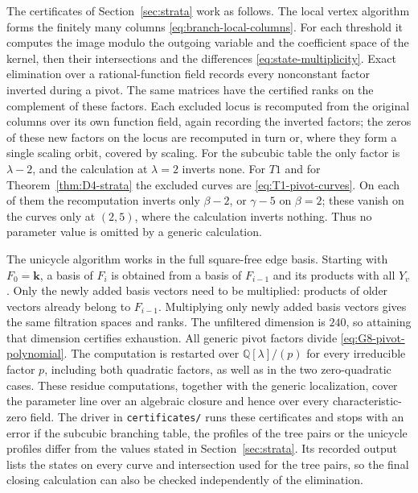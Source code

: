 \documentclass[reqno]{article}
\theoremstyle{plain} %
\theoremstyle{definition}
\theoremstyle{remark}
\newcommand{\K} {\mathbf{k}}
\numberwithin{equation}{section}
\begin{document}
The certificates of Section~\ref{sec:strata} work as follows. The local vertex algorithm forms the finitely many columns
\eqref{eq:branch-local-columns}. For each threshold it computes the image
modulo the outgoing variable and the coefficient space of the kernel,
then their intersections and the differences
\eqref{eq:state-multiplicity}. Exact elimination over a rational-function
field records every nonconstant factor inverted during a pivot.
The same matrices have the certified ranks on the complement of these
factors. Each excluded locus is recomputed from the original columns
over its own function field, again recording the inverted factors; the
zeros of these new factors on the locus are recomputed in turn or, where
they form a single scaling orbit, covered by scaling. For the subcubic
table the only factor is $\lambda-2$, and the calculation at
$\lambda=2$ inverts none. For $T1$ and for
Theorem~\ref{thm:D4-strata} the excluded curves are
\eqref{eq:T1-pivot-curves}. On each of them the recomputation inverts
only $\beta-2$, or $\gamma-5$ on $\beta=2$; these vanish on the curves
only at $(2,5)$, where the calculation inverts nothing. Thus no
parameter value is omitted by a generic calculation.

The unicycle algorithm works in the full square-free edge basis. Starting
with $F_0=\K$, a basis of $F_i$ is obtained from a basis of $F_{i-1}$ and
its products with all $Y_v$. Only the newly added basis vectors need to
be multiplied: products of older vectors already belong to $F_{i-1}$.
Multiplying only newly added basis vectors gives the same filtration
spaces and ranks.
The unfiltered dimension is $240$, so attaining that dimension certifies
exhaustion. All generic pivot factors divide
\eqref{eq:G8-pivot-polynomial}. The computation is restarted over
$\mathbb{Q}[\lambda]/(p)$ for every irreducible factor $p$, including both
quadratic factors, as well as in the two zero-quadratic cases.
These residue computations, together with the generic localization,
cover the parameter line over an algebraic closure and hence over every
characteristic-zero field.
The driver  in \texttt{certificates/}
runs these certificates and stops with an error if the subcubic branching
table, the profiles of the tree pairs or the unicycle profiles differ
from the values stated in Section~\ref{sec:strata}. Its recorded output
lists the states on every curve and intersection used for the tree pairs,
so the final closing calculation can also be checked independently of the
elimination.
\end{document}
